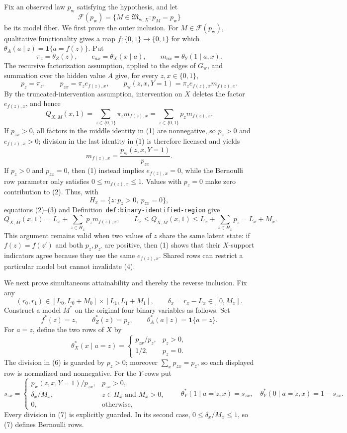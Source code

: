 Fix an observed law \(p_{\mathrm w}\) satisfying the hypothesis, and let
\[
\mathcal F(p_{\mathrm w})
=\{M\in\mathfrak M_{\mathrm w,X}:p_M=p_{\mathrm w}\}
\]
be its model fiber.  We first prove the outer inclusion.  For
\(M\in\mathcal F(p_{\mathrm w})\), qualitative functionality gives a map
\(f:\{0,1\}\to\{0,1\}\) for which
\(\theta_A(a\mid z)=\mathbf 1\{a=f(z)\}\).  Put
\[
\pi_z=\theta_Z(z),\qquad
e_{ax}=\theta_X(x\mid a),\qquad
m_{ax}=\theta_Y(1\mid a,x).
\]
The recursive factorization assumption, applied to the edges of
\(G_{\mathrm w}\), and summation over the hidden value \(A\) give, for every
\(z,x\in\{0,1\}\),
\[
p_z=\pi_z,
\qquad
p_{zx}=\pi_z e_{f(z),x},
\qquad
p_{\mathrm w}(z,x,Y=1)=\pi_z e_{f(z),x}m_{f(z),x}.
\tag{1}
\]
By the truncated-intervention assumption, intervention on \(X\) deletes the
factor \(e_{f(z),x}\), and hence
\[
Q_{X,M}(x,1)=\sum_{z\in\{0,1\}}\pi_zm_{f(z),x}
=\sum_{z\in\{0,1\}}p_zm_{f(z),x}.
\tag{2}
\]
If \(p_{zx}>0\), all factors in the middle identity in (1) are nonnegative,
so \(p_z>0\) and \(e_{f(z),x}>0\); division in the last identity in (1) is
therefore licensed and yields
\[
m_{f(z),x}=\frac{p_{\mathrm w}(z,x,Y=1)}{p_{zx}}.
\tag{3}
\]
If \(p_z>0\) and \(p_{zx}=0\), then (1) instead implies
\(e_{f(z),x}=0\), while the Bernoulli row parameter only satisfies
\(0\le m_{f(z),x}\le1\).  Values with \(p_z=0\) make zero contribution to
(2).  Thus, with
\[
H_x=\{z:p_z>0,\ p_{zx}=0\},
\]
equations (2)--(3) and Definition~\texttt{def:binary-identified-region}
give
\[
Q_{X,M}(x,1)
=L_x+\sum_{z\in H_x}p_zm_{f(z),x},
\qquad
L_x\le Q_{X,M}(x,1)\le L_x+\sum_{z\in H_x}p_z
=L_x+M_x.
\tag{4}
\]
This argument remains valid when two values of \(z\) share the same latent
state: if \(f(z)=f(z')\) and both \(p_z,p_{z'}\) are positive, then (1) shows
that their \(X\)-support indicators agree because they use the same
\(e_{f(z),x}\).  Shared rows can restrict a particular model but cannot
invalidate (4).

We next prove simultaneous attainability and thereby the reverse inclusion.
Fix any
\[
(r_0,r_1)\in[L_0,L_0+M_0]\times[L_1,L_1+M_1],
\qquad
\delta_x=r_x-L_x\in[0,M_x].
\]
Construct a model \(M^*\) on the original four binary variables as follows.
Set
\[
f^*(z)=z,
\qquad
\theta_Z^*(z)=p_z,
\qquad
\theta_A^*(a\mid z)=\mathbf 1\{a=z\}.
\tag{5}
\]
For \(a=z\), define the two rows of \(X\) by
\[
\theta_X^*(x\mid a=z)=
\begin{cases}
p_{zx}/p_z,&p_z>0,\\
1/2,&p_z=0.
\end{cases}
\tag{6}
\]
The division in (6) is guarded by \(p_z>0\); moreover
\(\sum_xp_{zx}=p_z\), so each displayed row is normalized and nonnegative.
For the \(Y\)-rows put
\[
s_{zx}=
\begin{cases}
p_{\mathrm w}(z,x,Y=1)/p_{zx},&p_{zx}>0,\\
\delta_x/M_x,&z\in H_x\text{ and }M_x>0,\\
0,&\text{otherwise},
\end{cases}
\qquad
\theta_Y^*(1\mid a=z,x)=s_{zx},
\quad
\theta_Y^*(0\mid a=z,x)=1-s_{zx}.
\tag{7}
\]
Every division in (7) is explicitly guarded.  In its second case,
\(0\le\delta_x/M_x\le1\), so (7) defines Bernoulli rows.


